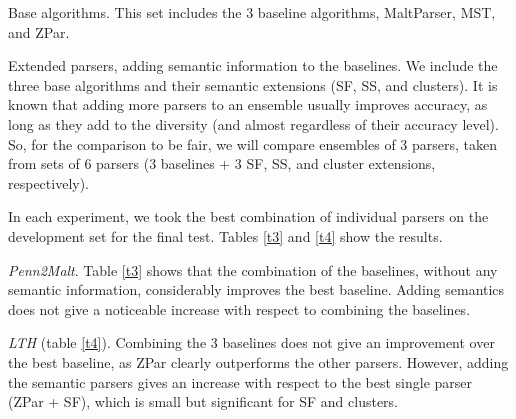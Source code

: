 \documentclass[11pt]{article}
\begin{document}
\begin{compactitem}
\item Base algorithms. This set includes the 3 baseline algorithms, MaltParser, MST, and ZPar.
\item Extended parsers, adding semantic information to the baselines. We include the 
three base algorithms and their semantic extensions (SF, SS, and clusters). 
It is known \cite{surdeanu-manning:2010:EnsembleParsing} that adding more parsers to an ensemble usually 
improves accuracy, as long as they add to the diversity (and almost regardless of their accuracy level). So, for 
the comparison to be fair, we will compare ensembles of 3 parsers, taken from sets of 6 
parsers (3 baselines + 3 SF, SS, and cluster extensions, respectively).
\end{compactitem}

In each experiment, we took the best combination of individual parsers on the 
development set for the final test. Tables \ref{t3} and  \ref{t4} show the results.

\emph{Penn2Malt}. Table \ref{t3} shows that the combination of the baselines, without any semantic information, 
considerably improves the best baseline. Adding semantics does not give a noticeable increase with respect to 
combining the baselines. %

\emph{LTH} (table \ref{t4}). Combining the 3 baselines does not give an improvement over the best 
baseline, as ZPar clearly outperforms the other parsers. However, adding the semantic parsers gives 
an increase with respect to the best single parser (ZPar + SF), which is small but significant for 
SF and clusters.%


%
\end{document}
